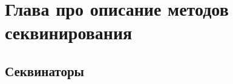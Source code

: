 \chapter{Глава про описание методов секвинирования} \label{chapt1}

\section{Секвинаторы} \label{sect1_1}

\clearpage
